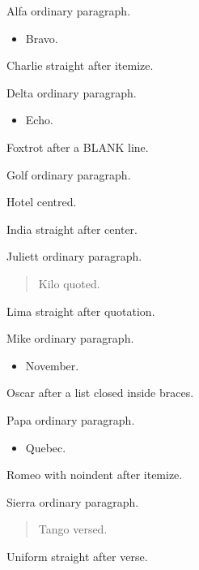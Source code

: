 \documentclass[10pt]{article}
\begin{document}
Alfa ordinary paragraph.
\begin{itemize}\item Bravo.\end{itemize}
Charlie straight after itemize.

Delta ordinary paragraph.
\begin{itemize}\item Echo.\end{itemize}

Foxtrot after a BLANK line.

Golf ordinary paragraph.
\begin{center}Hotel centred.\end{center}
India straight after center.

Juliett ordinary paragraph.
\begin{quotation}Kilo quoted.\end{quotation}
Lima straight after quotation.

Mike ordinary paragraph.
{\begin{itemize}\item November.\end{itemize}}
Oscar after a list closed inside braces.

Papa ordinary paragraph.
\begin{itemize}\item Quebec.\end{itemize}
\noindent Romeo with noindent after itemize.

Sierra ordinary paragraph.
\begin{verse}Tango versed.\end{verse}
Uniform straight after verse.
\end{document}
